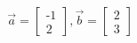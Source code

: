 \documentclass[preview]{standalone}
\begin{document}
\begin{align*}
\vec{a} = \begin{bmatrix} \text{-}1 \\ 2 \end{bmatrix}, \vec{b} = \begin{bmatrix} 2 \\ 3 \end{bmatrix}
\end{align*}
\end{document}
